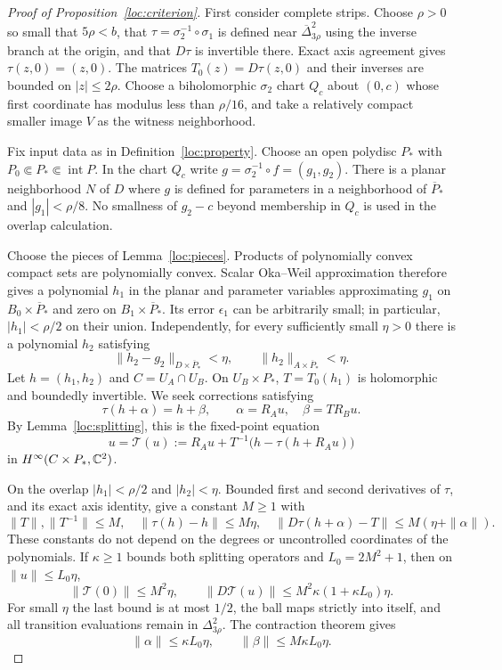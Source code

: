 \begin{proof}[Proof of Proposition~\ref{loc:criterion}]
First consider complete strips. Choose $\rho>0$ so small that
$5\rho<b$, that
$\tau=\sigma_2^{-1}\circ\sigma_1$ is defined near
$\overline{\Delta}_{3\rho}^2$ using the inverse branch at the origin,
and that $D\tau$ is invertible there. Exact axis agreement gives
$\tau(z,0)=(z,0)$. The matrices $T_0(z)=D\tau(z,0)$ and their
inverses are bounded on $|z|\le2\rho$.
Choose a biholomorphic $\sigma_2$ chart $Q_c$ about $(0,c)$ whose
first coordinate has modulus less than $\rho/16$, and take a
relatively compact smaller image $V$ as the witness neighborhood.

Fix input data as in Definition~\ref{loc:property}. Choose an open
polydisc $P_*$ with
$P_0\Subset P_*\Subset\operatorname{int}P$.
In the chart $Q_c$ write $g=\sigma_2^{-1}\circ f=(g_1,g_2)$.
There is a planar neighborhood $N$ of $D$ where $g$ is defined for
parameters in a neighborhood of $\overline P_*$ and
$|g_1|<\rho/8$. No smallness of $g_2-c$ beyond membership in $Q_c$
is used in the overlap calculation.

Choose the pieces of Lemma~\ref{loc:pieces}. Products of polynomially
convex compact sets are polynomially convex. Scalar Oka--Weil
approximation therefore gives a polynomial $h_1$ in the planar and
parameter variables approximating $g_1$ on
$B_0\times\overline P_*$ and zero on $B_1\times\overline P_*$.
Its error $\epsilon_1$ can be arbitrarily small; in particular,
$|h_1|<\rho/2$ on their union. Independently, for every sufficiently
small $\eta>0$ there is a polynomial $h_2$ satisfying
\[
\|h_2-g_2\|_{D\times\overline P_*}<\eta,\qquad
\|h_2\|_{A\times\overline P_*}<\eta.
\]
Let $h=(h_1,h_2)$ and $C=U_A\cap U_B$. On $U_B\times P_*$,
$T=T_0(h_1)$ is holomorphic and boundedly invertible.
We seek corrections satisfying
\[
\tau(h+\alpha)=h+\beta,\qquad
\alpha=R_Au,\quad\beta=T R_Bu.
\]
By Lemma~\ref{loc:splitting}, this is the fixed-point equation
\[
u=\mathcal T(u):=
R_Au+T^{-1}\bigl(h-\tau(h+R_Au)\bigr)
\]
in $H^\infty(C\times P_*,\mathbb C^2)$.

On the overlap $|h_1|<\rho/2$ and $|h_2|<\eta$.
Bounded first and second derivatives of $\tau$, and its exact
axis identity, give a constant $M\ge1$ with
\[
\|T\|,\|T^{-1}\|\le M,\quad
\|\tau(h)-h\|\le M\eta,\quad
\|D\tau(h+\alpha)-T\|\le M(\eta+\|\alpha\|).
\]
These constants do not depend on the degrees or uncontrolled
coordinates of the polynomials. If $\kappa\ge1$ bounds both
splitting operators and $L_0=2M^2+1$, then on $\|u\|\le L_0\eta$,
\[
\|\mathcal T(0)\|\le M^2\eta,\qquad
\|D\mathcal T(u)\|\le
M^2\kappa(1+\kappa L_0)\eta.
\]
For small $\eta$ the last bound is at most $1/2$, the ball maps
strictly into itself, and all transition evaluations remain in
$\Delta_{3\rho}^2$. The contraction theorem gives
\[
\|\alpha\|\le\kappa L_0\eta,\qquad
\|\beta\|\le M\kappa L_0\eta.
\]


\end{proof}
